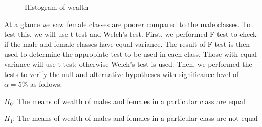 \begin{figure}[htp]
\centering 
{}


\caption{Histogram of wealth} \label{fig:Histogram of Wealth}

\end{figure}

At a glance we saw female classes are poorer compared to the male classes. To test this, we will use t-test and Welch's test. First, we performed F-test to check if the male and female classes have equal variance. The result of F-test is then used to determine the appropiate test to be used in each class. Those with equal variance will use t-test; otherwise Welch's test is used. Then, we performed the tests to verify the null and alternative hypotheses with significance level of \(\alpha=5\%\) as follows:

\(H_0\): The means of wealth of males and females in a particular class are equal

\(H_1\): The means of wealth of males and females in a particular class are not equal

